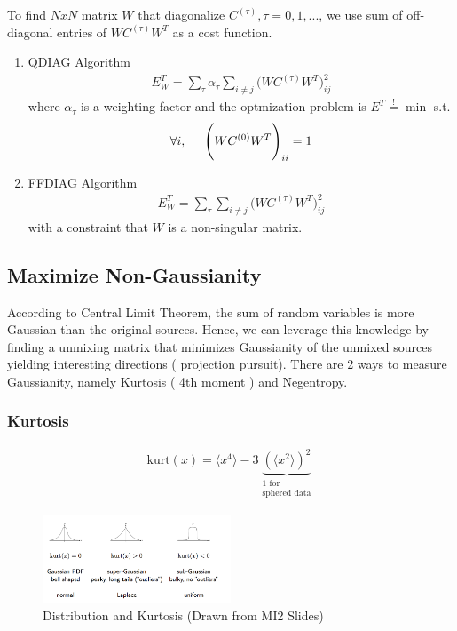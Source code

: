 To find $NxN$ matrix $W$ that diagonalize $C^{(\tau)}, \tau = 0,1, ...$, we use sum of off-diagonal entries of $WC^{(\tau)}W^T$ as a cost function.

\begin{enumerate}
	\item QDIAG Algorithm 
	\begin{align*}
		E^T_{W} = \sum_{\tau} \alpha_\tau \sum_{i \ne j}  \Bigg(  WC^{(\tau)}W^T \Bigg)_{ij}^2
	\end{align*}
	where $\alpha_\tau$ is a weighting factor and the optmization problem is $E^T \stackrel{!}{=} \min$ s.t. 
	$$
\forall i,  \hspace{0.5cm}	\Bigg(  WC^{(0)}W^T \Bigg)_{ii} = 1
	$$
	
	\item FFDIAG Algorithm 
	\begin{align*}
		E^T_{W} = \sum_{\tau}  \sum_{i \ne j}  \Bigg(  WC^{(\tau)}W^T \Bigg)_{ij}^2
	\end{align*}
	with a constraint that $W$ is a non-singular matrix.
\end{enumerate}


\subsection{Maximize Non-Gaussianity}
According to Central Limit Theorem, the sum of random variables is more Gaussian than the original sources. Hence, we can leverage this knowledge by finding a unmixing matrix that minimizes Gaussianity of the unmixed sources yielding interesting directions ( projection pursuit).  There are 2 ways to measure Gaussianity, namely Kurtosis ( 4th moment ) and Negentropy.

\subsubsection{Kurtosis}

\begin{align*}
	\text{kurt}(x) =   \langle x^4 \rangle - 3 \underbrace{ ( \langle x^2 \rangle ) ^2  }_{  \substack{ \text{1 for} \\ \text{sphered data} } }
\end{align*}

\begin{figure}[hbt]
	\center
  \includegraphics[width=0.5\textwidth]{figures/ica-kurtosis}
  \caption{Distribution and Kurtosis (Drawn from MI2 Slides)}
  \label{fig:ica-kurtosis}
\end{figure}

